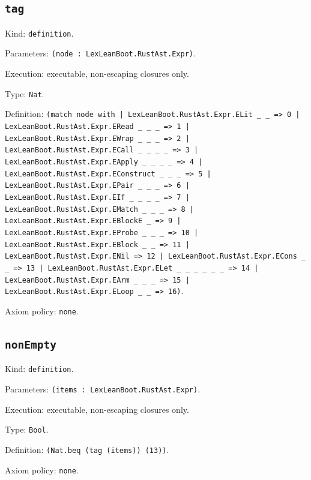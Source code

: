 \documentclass[11pt]{article}
\begin{document}
\subsection*{\texttt{tag}}
\noindent Kind: \texttt{definition}.\par
\noindent Parameters: \texttt{(node : LexLeanBoot.RustAst.Expr)}.\par
\noindent Execution: executable, non-escaping closures only.\par
\noindent Type: \texttt{Nat}.\par
\noindent Definition: \texttt{(match node with | LexLeanBoot.RustAst.Expr.ELit \_ \_ => 0 | LexLeanBoot.RustAst.Expr.ERead \_ \_ \_ => 1 | LexLeanBoot.RustAst.Expr.EWrap \_ \_ \_ => 2 | LexLeanBoot.RustAst.Expr.ECall \_ \_ \_ \_ => 3 | LexLeanBoot.RustAst.Expr.EApply \_ \_ \_ \_ => 4 | LexLeanBoot.RustAst.Expr.EConstruct \_ \_ \_ => 5 | LexLeanBoot.RustAst.Expr.EPair \_ \_ \_ => 6 | LexLeanBoot.RustAst.Expr.EIf \_ \_ \_ \_ => 7 | LexLeanBoot.RustAst.Expr.EMatch \_ \_ \_ => 8 | LexLeanBoot.RustAst.Expr.EBlockE \_ => 9 | LexLeanBoot.RustAst.Expr.EProbe \_ \_ \_ => 10 | LexLeanBoot.RustAst.Expr.EBlock \_ \_ => 11 | LexLeanBoot.RustAst.Expr.ENil => 12 | LexLeanBoot.RustAst.Expr.ECons \_ \_ => 13 | LexLeanBoot.RustAst.Expr.ELet \_ \_ \_ \_ \_ \_ => 14 | LexLeanBoot.RustAst.Expr.EArm \_ \_ \_ => 15 | LexLeanBoot.RustAst.Expr.ELoop \_ \_ => 16)}.\par
\noindent Axiom policy: \texttt{none}.\par
\subsection*{\texttt{nonEmpty}}
\noindent Kind: \texttt{definition}.\par
\noindent Parameters: \texttt{(items : LexLeanBoot.RustAst.Expr)}.\par
\noindent Execution: executable, non-escaping closures only.\par
\noindent Type: \texttt{Bool}.\par
\noindent Definition: \texttt{(Nat.beq (tag (items)) (13))}.\par
\noindent Axiom policy: \texttt{none}.\par
\end{document}

